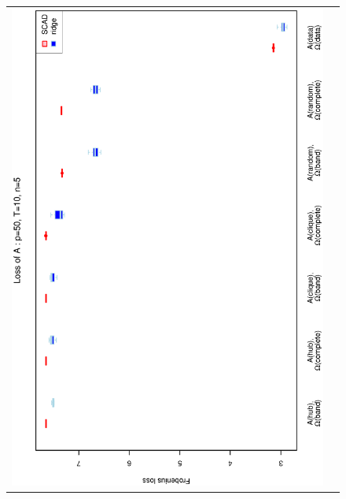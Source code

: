 \documentclass[a4paper]{article}
\begin{document}
\begin{figure}[h!]
\centering
\begin{tabular}{cc}
\includegraphics[scale=0.45,angle=270]{LossA50T10N5_25.eps}
\\

\end{tabular}
\end{figure}
\end{document}
